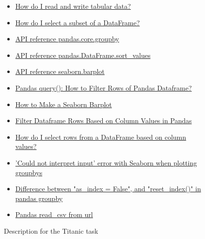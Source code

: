 \begin{figure}
\begin{mdframed}[backgroundcolor=gray!05]
\begin{scriptsize}
\begin{itemize}
    \item \href{https://pandas.pydata.org/docs/getting_started/intro_tutorials/02_read_write.html}{How do I read and write tabular data?}
    \item \href{https://pandas.pydata.org/docs/getting_started/intro_tutorials/03_subset_data.html}{How do I select a subset of a DataFrame?}
    \item \href{https://pandas.pydata.org/docs/reference/index.html}{API reference pandas.core.groupby}
    \item \href{https://pandas.pydata.org/docs/reference/api/pandas.DataFrame.sort_values.html}{API reference pandas.DataFrame.sort\_values}
    \item \href{https://seaborn.pydata.org/generated/seaborn.barplot.html}{API reference seaborn.barplot}
    \item \href{https://cmdlinetips.com/2019/07/how-to-select-rows-of-pandas-dataframe-with-query-function/}{Pandas query(): How to Filter Rows of Pandas Dataframe?}
    \item \href{https://seaborn.pydata.org/generated/seaborn.barplot.html}{How to Make a Seaborn Barplot}
    \item \href{https://www.delftstack.com/howto/python-pandas/how-to-filter-dataframe-rows-based-on-column-values-in-pandas/}{Filter Dataframe Rows Based on Column Values in Pandas}
    \item \href{https://stackoverflow.com/questions/17071871/how-do-i-select-rows-from-a-dataframe-based-on-column-values}{How do I select rows from a DataFrame based on column values?}
    \item \href{https://stackoverflow.com/questions/32908315/could-not-interpret-input-error-with-seaborn-when-plotting-groupbys}{'Could not interpret input' error with Seaborn when plotting groupbys}
    \item \href{https://stackoverflow.com/questions/51866908/difference-between-as-index-false-and-reset-index-in-pandas-groupby}{Difference between "as\_index = False", and "reset\_index()" in pandas groupby}
    \item \href{https://stackoverflow.com/questions/32400867/pandas-read-csv-from-url}{Pandas read\_csv from url}
\end{itemize}

\end{scriptsize}
\end{mdframed}
\caption{Description for the Titanic task}
\end{figure}

    